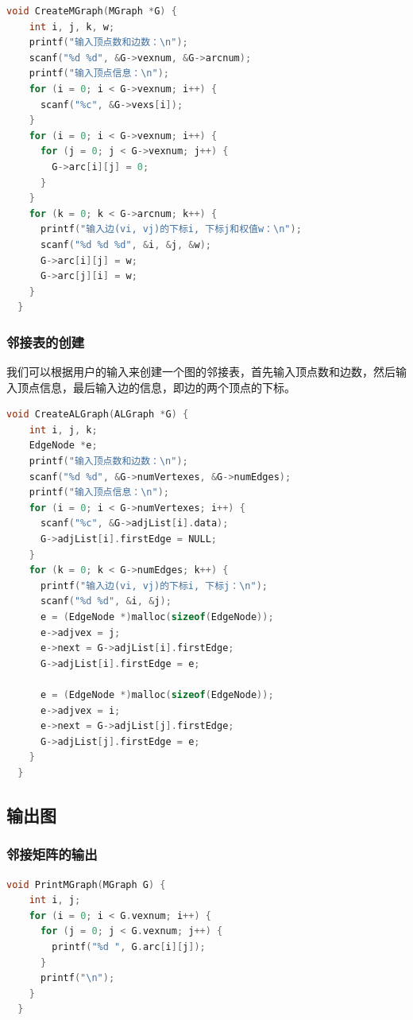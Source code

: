 \documentclass[lang=cn,newtx,10pt,scheme=chinese]{../elegantbook}
\begin{document}
\begin{lstlisting}[language=C++, caption={邻接矩阵的创建}]
  void CreateMGraph(MGraph *G) {
    int i, j, k, w;
    printf("输入顶点数和边数：\n");
    scanf("%d %d", &G->vexnum, &G->arcnum);
    printf("输入顶点信息：\n");
    for (i = 0; i < G->vexnum; i++) {
      scanf("%c", &G->vexs[i]);
    }
    for (i = 0; i < G->vexnum; i++) {
      for (j = 0; j < G->vexnum; j++) {
        G->arc[i][j] = 0;
      }
    }
    for (k = 0; k < G->arcnum; k++) {
      printf("输入边(vi, vj)的下标i, 下标j和权值w：\n");
      scanf("%d %d %d", &i, &j, &w);
      G->arc[i][j] = w;
      G->arc[j][i] = w;
    }
  }
\end{lstlisting}

\subsubsection{邻接表的创建}

我们可以根据用户的输入来创建一个图的邻接表，首先输入顶点数和边数，然后输入顶点信息，最后输入边的信息，即边的两个顶点的下标。
\begin{lstlisting}[language=C++, caption={邻接表的创建}]
  void CreateALGraph(ALGraph *G) {
    int i, j, k;
    EdgeNode *e;
    printf("输入顶点数和边数：\n");
    scanf("%d %d", &G->numVertexes, &G->numEdges);
    printf("输入顶点信息：\n");
    for (i = 0; i < G->numVertexes; i++) {
      scanf("%c", &G->adjList[i].data);
      G->adjList[i].firstEdge = NULL;
    }
    for (k = 0; k < G->numEdges; k++) {
      printf("输入边(vi, vj)的下标i, 下标j：\n");
      scanf("%d %d", &i, &j);
      e = (EdgeNode *)malloc(sizeof(EdgeNode));
      e->adjvex = j;
      e->next = G->adjList[i].firstEdge;
      G->adjList[i].firstEdge = e;

      e = (EdgeNode *)malloc(sizeof(EdgeNode));
      e->adjvex = i;
      e->next = G->adjList[j].firstEdge;
      G->adjList[j].firstEdge = e;
    }
  }

\end{lstlisting}

\subsection{输出图}

\subsubsection{邻接矩阵的输出}

\begin{lstlisting}[language=C++, caption={邻接矩阵的输出}]
  void PrintMGraph(MGraph G) {
    int i, j;
    for (i = 0; i < G.vexnum; i++) {
      for (j = 0; j < G.vexnum; j++) {
        printf("%d ", G.arc[i][j]);
      }
      printf("\n");
    }
  }
\end{lstlisting}
\end{document}
